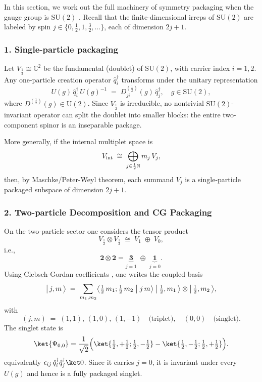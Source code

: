 \documentclass[12pt,a4paper]{article}
\begin{document}
In this section, we work out the full machinery of symmetry packaging when the gauge group is $\mathrm{SU}(2)$ \cite{Yang1954}.
Recall that the finite-dimensional irreps of $\mathrm{SU}(2)$ are labeled by spin $j\in\{0,\tfrac12,1,\tfrac32,\dots\}$, each of dimension $2j+1$.  



\subsubsection*{1. Single-particle packaging}

Let $V_{\frac12}\cong\mathbb C^2$ be the fundamental (doublet) of $\mathrm{SU}(2)$, with carrier index $i=1,2$.  Any one-particle creation operator $\hat q^\dagger_i$ transforms under the unitary representation
\[
U(g)\,\hat q^\dagger_i\,U(g)^{-1}
\;=\;
D^{(\frac12)}_{ji}(g)\,\hat q^\dagger_j,
\quad
g\in\mathrm{SU}(2),
\]
where $D^{(\frac12)}(g)\in\mathrm{U}(2)$.  Since $V_{\frac12}$ is irreducible, no nontrivial $\mathrm{SU}(2)$-invariant operator can split the doublet into smaller blocks: the entire two-component spinor is an inseparable package.

More generally, if the internal multiplet space is 
\[
V_{\rm int}
\;\cong\;
\bigoplus_{j\in\frac12\mathbb N} m_j\,V_j,
\]
then, by Maschke/Peter-Weyl theorem, each summand $V_j$ is a single-particle packaged subspace of dimension $2j+1$.



\subsubsection*{2. Two-particle Decomposition and CG Packaging}


On the two-particle sector one considers the tensor product
\[
V_{\tfrac12}\otimes V_{\tfrac12}
\;\cong\;
V_1\;\oplus\;V_0,
\]
i.e.,
\[
\mathbf2\otimes\mathbf2
=
\underbrace{\mathbf3}_{j=1}
\;\oplus\;
\underbrace{\mathbf1}_{j=0}.
\]
Using Clebsch-Gordan coefficients \cite{Racah1942,Wigner1959}, one writes the coupled basis
\[
\bigl|\,j,m\,\bigr\rangle
\;=\;
\sum_{m_1,m_2}
\bigl\langle\tfrac12\,m_1;\tfrac12\,m_2\bigm|j\,m\bigr\rangle
\;\bigl|\,\tfrac12,m_1\,\bigr\rangle
\otimes
\bigl|\,\tfrac12,m_2\,\bigr\rangle,
\]
with
\[
(j,m)\;=\;(1,1),\,(1,0),\,(1,-1)\quad\text{(triplet)},
\quad
(0,0)\quad\text{(singlet)}.
\]
The singlet state is
$$
\ket{\Psi_{0,0}}
= \frac1{\sqrt2}\Bigl(\ket{\tfrac12,+\tfrac12;\tfrac12,-\tfrac12}
- \ket{\tfrac12,-\tfrac12;\tfrac12,+\tfrac12}\Bigr).
$$
equivalently $ \epsilon_{ij}\,\hat q^\dagger_i\hat q^\dagger_j\ket0$.
Since it carries $j=0$, it is invariant under every $U(g)$ and hence is a fully packaged singlet.
\end{document}
